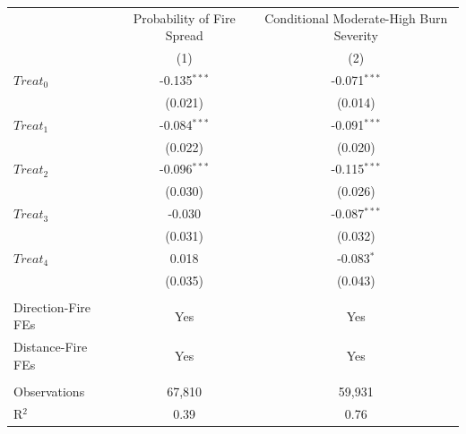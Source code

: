 \begingroup
\centering
\begin{tabular}{lcc}
   \toprule
                      & Probability of Fire Spread & Conditional Moderate-High Burn Severity\\  
                      & (1)                        & (2)\\  
   \midrule 
   $Treat_0$          & -0.135$^{***}$             & -0.071$^{***}$\\   
                      & (0.021)                    & (0.014)\\   
   $Treat_1$          & -0.084$^{***}$             & -0.091$^{***}$\\   
                      & (0.022)                    & (0.020)\\   
   $Treat_2$          & -0.096$^{***}$             & -0.115$^{***}$\\   
                      & (0.030)                    & (0.026)\\   
   $Treat_3$          & -0.030                     & -0.087$^{***}$\\   
                      & (0.031)                    & (0.032)\\   
   $Treat_4$          & 0.018                      & -0.083$^{*}$\\   
                      & (0.035)                    & (0.043)\\   
    \\
   Direction-Fire FEs & Yes                        & Yes\\  
   Distance-Fire FEs  & Yes                        & Yes\\  
    \\
   Observations       & 67,810                     & 59,931\\  
   R$^2$              & 0.39                       & 0.76\\  
   \bottomrule
\end{tabular}
\par\endgroup
